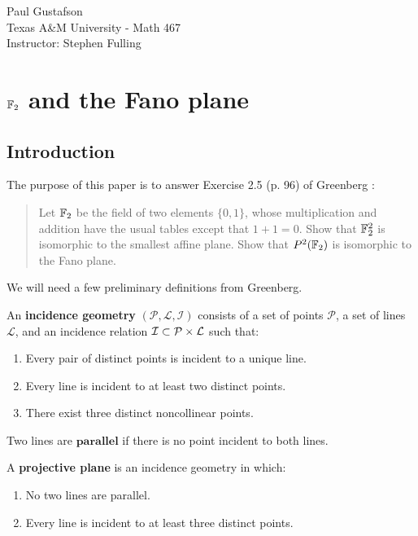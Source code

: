 \documentclass{article}
\begin{document}
\noindent Paul Gustafson\\
\noindent Texas A\&M University - Math 467\\ 
\noindent Instructor: Stephen Fulling

\section{$\mathbb{F}_2$ and the Fano plane}
\subsection{Introduction}
The purpose of this paper is to answer Exercise 2.5 (p. 96) of Greenberg \cite{g}:
\begin{quote}
Let $\mathbb{F}_2$ be the field of two elements $\{0,1\}$, whose multiplication and addition have the usual tables except that $1+1 = 0$. Show that $\mathbb{F}_2^2$ is isomorphic to the smallest affine plane. Show that $P^2(\mathbb{F}_2)$ is isomorphic to the Fano plane.
\end{quote}

We will need a few preliminary definitions from Greenberg.

\begin{definition}
An \textbf{incidence geometry} $(\mathcal{P}, \mathcal{L}, \mathcal{I})$ consists of a set of points $\mathcal{P}$, a set of lines $\mathcal{L}$, and an incidence relation $\mathcal{I} \subset \mathcal{P} \times \mathcal{L}$ such that:
\begin{enumerate}
\item Every pair of distinct points is incident to a unique line.
\item Every line is incident to at least two distinct points.
\item There exist three distinct noncollinear points. 
\end{enumerate}
\end{definition}

\begin{definition}
Two lines are $\textbf{parallel}$ if there is no point incident to both lines.
\end{definition}


\begin{definition}
A \textbf{projective plane} is an incidence geometry in which:
\begin{enumerate}
\item No two lines are parallel.
\item Every line is incident to at least three distinct points.
\end{enumerate}
\end{definition}
\end{document}
